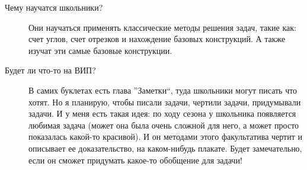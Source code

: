 \begin{description}
    \item[Чему научатся школьники?] Они научаться применять классические методы решения задач, такие как: счет углов, счет отрезков и нахождение базовых конструкций. А также изучат эти самые базовые конструкции.

    \item[Будет ли что-то на ВИП?] В самих буклетах есть глава ''Заметки``, туда школьники могут писать что хотят. Но я планирую, чтобы писали задачи, чертили задачи, придумывали задачи. И у меня есть такая идея: по ходу сезона у школьника появляется любимая задача (может она была очень сложной для него, а может просто показалась какой-то красивой). И он методами этого факультатива чертит и описывает ее доказательство, на каком-нибудь плакате. Будет замечательно, если он сможет придумать какое-то обобщение для задачи!
\end{description}
\pagebreak